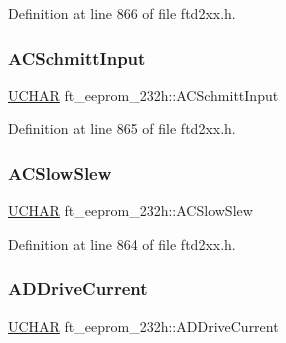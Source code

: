 Definition at line 866 of file ftd2xx.\+h.

\mbox{\label{structft__eeprom__232h_a025e35a0ae019370a4ea968f1cc2df2b}} 
\subsubsection{\texorpdfstring{A\+C\+Schmitt\+Input}{ACSchmittInput}}
{\footnotesize\ttfamily \hyperlink{CatCaloProto40MHz_2inc_2WinTypes_8h_a4f4bb67531a9bf6f0b9c6ad76aeba587}{U\+C\+H\+AR} ft\+\_\+eeprom\+\_\+232h\+::\+A\+C\+Schmitt\+Input}



Definition at line 865 of file ftd2xx.\+h.

\mbox{\label{structft__eeprom__232h_a3cfbbe62de0029839534fb469a9b50c9}} 
\subsubsection{\texorpdfstring{A\+C\+Slow\+Slew}{ACSlowSlew}}
{\footnotesize\ttfamily \hyperlink{CatCaloProto40MHz_2inc_2WinTypes_8h_a4f4bb67531a9bf6f0b9c6ad76aeba587}{U\+C\+H\+AR} ft\+\_\+eeprom\+\_\+232h\+::\+A\+C\+Slow\+Slew}



Definition at line 864 of file ftd2xx.\+h.

\mbox{\label{structft__eeprom__232h_a6aa2aea692700ed5e98a958819db3944}} 
\subsubsection{\texorpdfstring{A\+D\+Drive\+Current}{ADDriveCurrent}}
{\footnotesize\ttfamily \hyperlink{CatCaloProto40MHz_2inc_2WinTypes_8h_a4f4bb67531a9bf6f0b9c6ad76aeba587}{U\+C\+H\+AR} ft\+\_\+eeprom\+\_\+232h\+::\+A\+D\+Drive\+Current}



